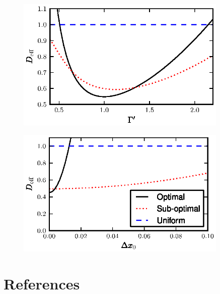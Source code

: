 \documentclass[12pt]{iopart}
\begin{document}
\begin{figure}
\includegraphics[width=0.9\textwidth]{fig3.eps}
\end{figure}

\begin{figure}
\includegraphics[width=0.9\textwidth]{fig4.eps}
\end{figure}

\section*{References}


\end{document}
